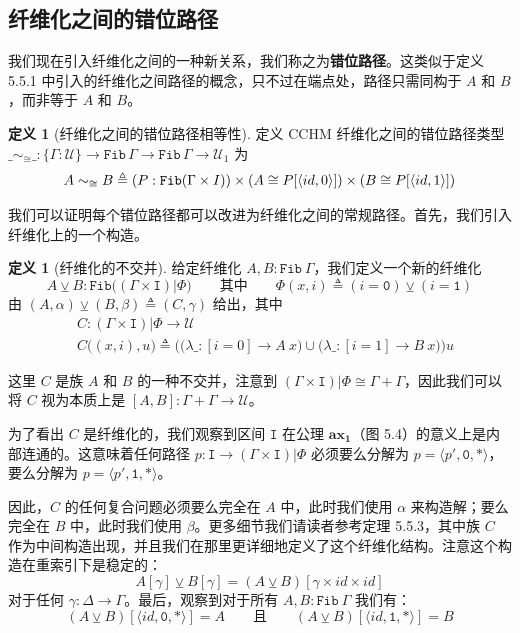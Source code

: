 \documentclass{ctexrep}
\let\mathbb\relax %
\theoremstyle{plain}
\theoremstyle{definition}
\newtheorem{definition}[theorem]{定义}
\theoremstyle{remark}
\newcommand{\ax}[1]{\mathbf{ax_{#1}}}
\begin{document}
\subsection{纤维化之间的错位路径}

我们现在引入纤维化之间的一种新关系，我们称之为\textbf{错位路径}。这类似于定义 5.5.1 中引入的纤维化之间路径的概念，只不过在端点处，路径只需同构于 $A$ 和 $B$，而非等于 $A$ 和 $B$。

\begin{definition}[纤维化之间的错位路径相等性]
定义 CCHM 纤维化之间的错位路径类型 $\_\sim_{\cong}\_ : \{\Gamma : \mathcal{U}\} \to \mathtt{Fib}\,\Gamma \to \mathtt{Fib}\,\Gamma \to \mathcal{U}_1$ 为
\[
A \sim_{\cong} B \triangleq (P : \mathtt{Fib}(\Gamma \times \mathbb{I})) \times (A \cong P[\langle  id , 0\rangle]) \times (B \cong P[\langle  id , 1\rangle])
\]
\end{definition}

我们可以证明每个错位路径都可以改进为纤维化之间的常规路径。首先，我们引入纤维化上的一个构造。

\begin{definition}[纤维化的不交并]
给定纤维化 $A, B : \mathtt{Fib}\ \Gamma$，我们定义一个新的纤维化
$$A \veebar B : \mathtt{Fib}\big((\Gamma \times \mathtt{I})|\Phi\big) \qquad \text{其中} \qquad \Phi(x,i) \triangleq (i = \mathtt{0}) \veebar (i = \mathtt{1})$$
由 $(A,\alpha) \veebar (B,\beta) \triangleq (C,\gamma)$ 给出，其中
\begin{align*}
& C : (\Gamma \times \mathtt{I})|\Phi \to \mathcal{U} \\
& C\big((x,i),u\big) \triangleq \Big(\big(\lambda\_ : [i=0] \to A\ x\big) \cup \big(\lambda\_ : [i=1] \to B\ x\big)\Big)u
\end{align*}

这里 $C$ 是族 $A$ 和 $B$ 的一种不交并，注意到 $(\Gamma \times \mathtt{I})|\Phi \cong \Gamma + \Gamma$，因此我们可以将 $C$ 视为本质上是 $[A,B] : \Gamma + \Gamma \to \mathcal{U}$。

为了看出 $C$ 是纤维化的，我们观察到区间 $\mathtt{I}$ 在公理 $\ax{1}$（图 5.4）的意义上是内部连通的。这意味着任何路径 $p : \mathtt{I} \to (\Gamma \times \mathtt{I})|\Phi$ 必须要么分解为 $p = \langle p', \mathtt{0}, * \rangle$，要么分解为 $p = \langle p', \mathtt{1}, * \rangle$。

因此，$C$ 的任何复合问题必须要么完全在 $A$ 中，此时我们使用 $\alpha$ 来构造解；要么完全在 $B$ 中，此时我们使用 $\beta$。更多细节我们请读者参考定理 5.5.3，其中族 $C$ 作为中间构造出现，并且我们在那里更详细地定义了这个纤维化结构。注意这个构造在重索引下是稳定的：
$$A[\gamma] \veebar B[\gamma] = (A \veebar B)[\gamma \times  id  \times  id ]$$
对于任何 $\gamma : \Delta \to \Gamma$。最后，观察到对于所有 $A, B : \mathtt{Fib}\ \Gamma$ 我们有：
$$(A \veebar B)[\langle  id , \mathtt{0}, * \rangle] = A \qquad \text{且} \qquad (A \veebar B)[\langle  id , \mathtt{1}, * \rangle] = B$$
\end{definition}
\end{document}

